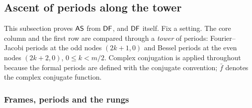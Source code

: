 \subsection{Ascent of periods along the tower}\label{sec:pf:fs:ascent}

This subsection proves $\mathsf{AS}$ from $\mathsf{DF}$, and $\mathsf{DF}$ itself. Fix a setting. The core column and the first row are
compared through a \emph{tower} of periods: Fourier--Jacobi periods at the odd nodes $(2k+1,0)$ and Bessel periods at the even
nodes $(2k+2,0)$, $0\le k<m/2$. Complex conjugation is applied throughout because the formal periods are defined with the
conjugate convention; $\bar f$ denotes the complex conjugate function.

\subsubsection{Frames, periods and the rungs}

